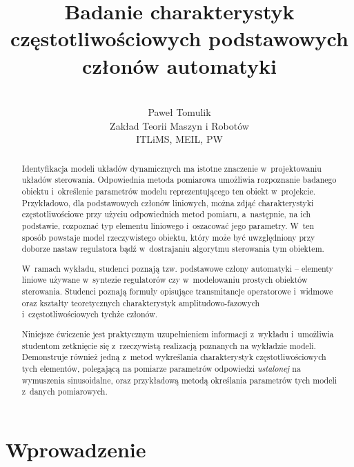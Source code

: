 \documentclass[paper=a4,DIV=12]{lpas}
\begin{document}
\subject{Laboratorium pomiarów, automatyki i~sterowania~I}
\title{Badanie charakterystyk częstotliwościowych podstawowych członów automatyki}

\author{\\Paweł Tomulik\\ Zakład Teorii Maszyn i Robotów\\ ITLiMS, MEIL, PW}

\date{}
\maketitle

\pagebreak
\tableofcontents
\pagebreak

\begin{abstract}
\noindent Identyfikacja modeli układów dynamicznych ma istotne znaczenie
  w~projektowaniu układów sterowania. Odpowiednia metoda pomiarowa umożliwia
  rozpoznanie badanego obiektu i~określenie parametrów modelu reprezentującego
  ten obiekt w~projekcie. Przykładowo, dla podstawowych członów liniowych,
  można zdjąć charakterystyki częstotliwościowe przy użyciu odpowiednich metod
  pomiaru, a~następnie, na ich podstawie, rozpoznać typ elementu liniowego
  i~oszacować jego parametry. W~ten sposób powstaje model rzeczywistego
  obiektu, który może być uwzględniony przy doborze nastaw regulatora bądź
  w~dostrajaniu algorytmu sterowania tym obiektem.

  W~ramach wykładu, studenci poznają tzw. podstawowe człony automatyki --
  elementy liniowe używane w~syntezie regulatorów czy w~modelowaniu prostych
  obiektów sterowania. Studenci poznają formuły opisujące transmitancje
  operatorowe i~widmowe oraz kształty teoretycznych charakterystyk
  am\-pli\-tu\-do\-wo-fa\-zo\-wych i~częstotliwościowych tychże członów.

  Niniejsze ćwiczenie jest praktycznym uzupełnieniem informacji z~wykładu
  i~umożliwia studentom zetknięcie się z~rzeczywistą realizacją poznanych na
  wykładzie modeli. Demonstruje również jedną z~metod wykreślania
  charakterystyk częstotliwościowych tych elementów, polegającą na pomiarze
  parametrów odpowiedzi {\em ustalonej} na wymuszenia sinusoidalne, oraz
  przykładową metodą określania parametrów tych modeli z~danych pomiarowych.
\end{abstract}

\section{Wprowadzenie}
\label{sec:AA9C2}
\end{document}

